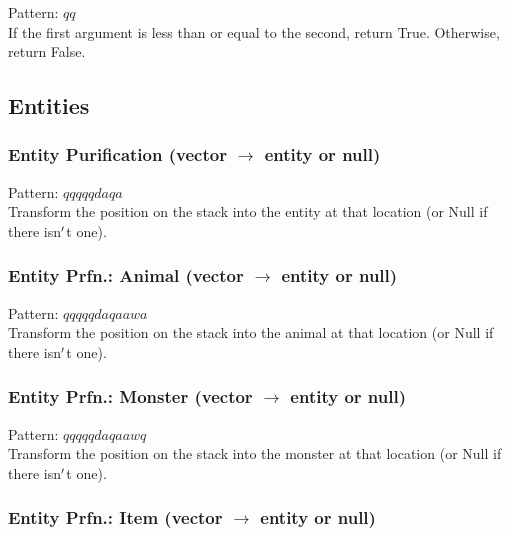 \documentclass[12pt]{article}
\begin{document}
    Pattern: $qq$\\
      If the first argument is less than or equal to the second, return True. Otherwise, return False.\\

\newpage

\label{sec:patterns/entities}
\subsection*{Entities}


  \label{sec: patterns/entities@hexcasting:get_entity}
\subsubsection*{Entity Purification (vector $\rightarrow$ entity or null)}

    Pattern: $qqqqqdaqa$\\
      Transform the position on the stack into the entity at that location (or Null if there isn$\rq$t one).\\


  \label{sec: patterns/entities@hexcasting:get_entity/animal}
\subsubsection*{Entity Prfn.: Animal (vector $\rightarrow$ entity or null)}

    Pattern: $qqqqqdaqaawa$\\
      Transform the position on the stack into the animal at that location (or Null if there isn$\rq$t one).\\


  \label{sec: patterns/entities@hexcasting:get_entity/monster}
\subsubsection*{Entity Prfn.: Monster (vector $\rightarrow$ entity or null)}

    Pattern: $qqqqqdaqaawq$\\
      Transform the position on the stack into the monster at that location (or Null if there isn$\rq$t one).\\


  \label{sec: patterns/entities@hexcasting:get_entity/item}
\subsubsection*{Entity Prfn.: Item (vector $\rightarrow$ entity or null)}
\end{document}

